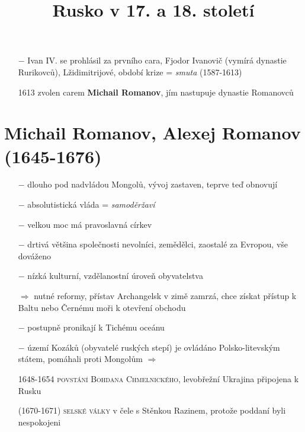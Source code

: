 \documentclass{article}
\title{\vspace{-2cm}Rusko v 17. a 18. století\vspace{-1.7cm}}
\date{}
\author{}
\begin{document}
\maketitle

\begin{itemize}
    \vspace{-0.5em}
    \setlength\itemsep{0.15em}
    \item[$-$] Ivan IV. se prohlásil za prvního cara, Fjodor Ivanovič (vymírá dynastie Rurikovců), Lžidimitrijové, období krize = \textit{smuta} (1587-1613)
    \item[1613] zvolen carem \textbf{Michail Romanov}, jím nastupuje dynastie Romanovců
\end{itemize}

\section*{Michail Romanov, Alexej Romanov (1645-1676)}
\begin{itemize}
    \vspace{-0.5em}
    \setlength\itemsep{0.15em}
    \item[$-$] dlouho pod nadvládou Mongolů, vývoj zastaven, teprve teď obnovují
    \item[$-$] absolutistická vláda = \textit{samoděržaví}
    \item[$-$] velkou moc má pravoslavná církev
    \item[$-$] drtivá většina společnosti nevolníci, zemědělci, zaostalé za Evropou, vše dováženo
    \item[$-$] nízká kulturní, vzdělanostní úroveň obyvatelstva
    \item[$\Rightarrow$] nutné reformy, přístav Archangelsk v zimě zamrzá, chce získat přístup k Baltu nebo Černému moři k otevření obchodu
    \item[$-$] postupně pronikají k Tichému oceánu
    \item[$-$] území Kozáků (obyvatelé ruských stepí) je ovládáno Polsko-litevským státem, pomáhali proti Mongolům $\Rightarrow$
    \item[1648-1654] \textsc{povstání Bohdana Chmelnického}, levobřežní Ukrajina připojena k Rusku
    \item[(1670-1671)] \textsc{selské války} v čele s Stěnkou Razinem, protože poddaní byli nespokojeni
\end{itemize}
\end{document}
